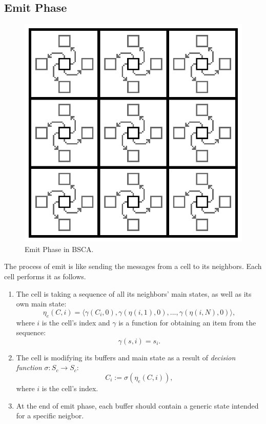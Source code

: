 \documentclass[a4paper,12pt,tikz,UTF8]{article}
\begin{document}
  \subsection{Emit Phase}

    \begin{figure}[H]
      \centering
      \includegraphics[scale=0.2]{bsca_emit}
      \caption{Emit Phase in BSCA.}
      \label{fig:emit-phase}
    \end{figure}

    The process of emit is like sending the messages from a cell to its neighbors. Each cell performs it as follows.
    \begin{enumerate}
      \item 
        The cell is taking a sequence of all its neighbors' main states, as well as its own main state:
        \begin{equation}
          \label{eq:neighbors-main-sequence}
          \eta_e(C, i) = \langle \gamma({C_i}, 0), \gamma(\eta(i, 1), 0), ..., \gamma(\eta(i, N), 0) \rangle,
        \end{equation}
        where $i$ is the cell's index and $\gamma$ is a function for obtaining an item from the sequence:
        \begin{equation}
          \label{eq:item-obtaining}
          \gamma(s, i) = s_i.
        \end{equation}
      \item
        The cell is modifying its buffers and main state as a result of \textit{decision function} $\sigma: S_c \to S_c$:
        \begin{equation}
          C_i := \sigma(\eta_e(C, i)),
        \end{equation}
        where $i$ is the cell's index.
      \item
        At the end of emit phase, each buffer should contain a generic state intended for a specific neigbor. 
    \end{enumerate}
\end{document}
